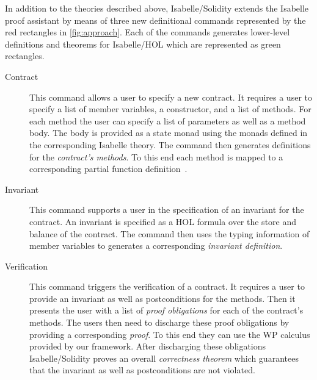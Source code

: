\documentclass[a4paper,UKenglish,cleveref, autoref, thm-restate]{oasics-v2021}
\begin{document}
In addition to the theories described above, Isabelle/Solidity extends the Isabelle proof assistant by means of three new definitional commands represented by the {\color{red}red rectangles} in \autoref{fig:approach}.
Each of the commands generates lower-level definitions and theorems for Isabelle/HOL which are represented as {\color{green}green rectangles}.
\begin{description}
    \item[Contract]
    This command allows a user to specify a new contract.
    It requires a user to specify a list of member variables, a constructor, and a list of methods.
    For each method the user can specify a list of parameters as well as a method body.
    The body is provided as a state monad using the monads defined in the corresponding Isabelle theory.
    The command then generates definitions for the \emph{contract's methods}.
    To this end each method is mapped to a corresponding partial function definition~\cite{Krauss2010}.
    \item[Invariant]
    This command supports a user in the specification of an invariant for the contract.
    An invariant is specified as a HOL formula over the store and balance of the contract.
    The command then uses the typing information of member variables to generates a corresponding \emph{invariant definition}.
    \item[Verification]
    This command triggers the verification of a contract.
    It requires a user to provide an invariant as well as postconditions for the methods.
    Then it presents the user with a list of \emph{proof obligations} for each of the contract's methods.
    The users then need to discharge these proof obligations by providing a corresponding \emph{proof}.
    To this end they can use the WP calculus provided by our framework.
    After discharging these obligations Isabelle/Solidity proves an overall \emph{correctness theorem} which guarantees that the invariant as well as postconditions are not violated.
\end{description}
\end{document}
